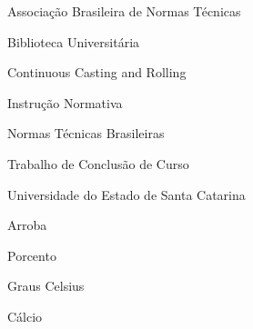 
\listoffigures*
\cleardoublepage



\listoftables*
\cleardoublepage

\begin{siglas}
	\item[ABNT] Associação Brasileira de Normas Técnicas
	\item[BU] Biblioteca Universitária
	\item[CCR] Continuous Casting and Rolling
	\item[IN] Instrução Normativa
	\item[NBR] Normas Técnicas Brasileiras
	\item[TCC] Trabalho de Conclusão de Curso
	\item[Udesc] Universidade do Estado de Santa Catarina
\end{siglas}



\begin{simbolos}
  \item[@] Arroba
  \item[\%] Porcento
  \item[$^\circ$C] Graus Celsius
  \item[Ca] Cálcio
\end{simbolos}

